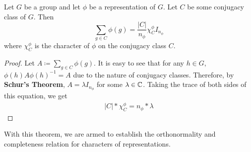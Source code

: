 \begin{theorem}
	Let $G$ be a group and let $\phi$ be a representation of $G$. Let $C$ be some conjugacy class of $G$. Then 
$$\sum_{g\in C} \phi(g) =\frac{|C|}{n_\phi} \chi^\phi_C I_{n_\phi}$$
where $\chi^\phi_C$ is the character of $\phi$ on the conjugacy class $C$.
\end{theorem}
\begin{proof}\cite{Tung}  Let $A\coloneq \sum_{g\in C} \phi(g)$. It is easy to see that for any $h\in G$, $\phi(h)A\phi(h)^{-1} = A$ due to the nature of conjugacy classes. Therefore, by \textbf{Schur's Theorem}, $A = \lambda I_{n_\phi}$ for some $\lambda \in \mathbb{C}$. Taking the trace of both sides of this equation, we get 
\begin{equation}
	\begin{aligned}
		|C| * \chi_C^\phi = n_\phi * \lambda 
	\end{aligned}
\end{equation}
\end{proof}

With this theorem, we are armed to establish the orthonormality and completeness relation for characters of representations.

